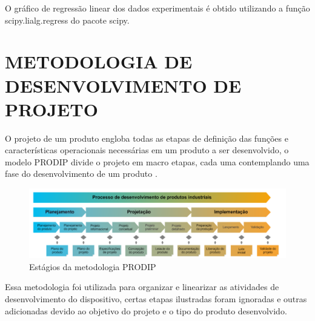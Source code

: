 O gráfico de regressão linear dos dados experimentais é obtido utilizando a função scipy.lialg.regress do pacote scipy.

\section{METODOLOGIA DE DESENVOLVIMENTO DE PROJETO}

O projeto de um produto engloba todas as etapas de definição das funções e características operacionais necessárias em um produto a ser desenvolvido, o modelo PRODIP divide o projeto em macro etapas, cada uma contemplando uma fase do desenvolvimento de um produto \autocite{PRODIP}.

\begin{figure}[htb]
	\caption{\label{fig:1170} Estágios da metodologia PRODIP}
	\begin{center}
		\includegraphics[width=\textwidth]{pictures/1170.png}
	\end{center}
\end{figure}

Essa metodologia foi utilizada para organizar e linearizar as atividades de desenvolvimento do dispositivo, certas etapas ilustradas foram ignoradas e outras adicionadas devido ao objetivo do projeto e o tipo do produto desenvolvido.


